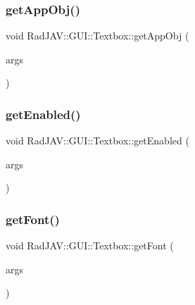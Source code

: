 \subsubsection{\texorpdfstring{get\+App\+Obj()}{getAppObj()}}
{\footnotesize\ttfamily void Rad\+J\+A\+V\+::\+G\+U\+I\+::\+Textbox\+::get\+App\+Obj (\begin{DoxyParamCaption}\item[{const v8\+::\+Function\+Callback\+Info$<$ v8\+::\+Value $>$ \&}]{args }\end{DoxyParamCaption})\hspace{0.3cm}{\ttfamily [static]}}

\mbox{\label{class_rad_j_a_v_1_1_g_u_i_1_1_textbox_a3cb05aa924bb2ac9497452eae8193d2d}} 
\subsubsection{\texorpdfstring{get\+Enabled()}{getEnabled()}}
{\footnotesize\ttfamily void Rad\+J\+A\+V\+::\+G\+U\+I\+::\+Textbox\+::get\+Enabled (\begin{DoxyParamCaption}\item[{const v8\+::\+Function\+Callback\+Info$<$ v8\+::\+Value $>$ \&}]{args }\end{DoxyParamCaption})\hspace{0.3cm}{\ttfamily [static]}}

\mbox{\label{class_rad_j_a_v_1_1_g_u_i_1_1_textbox_a4fea6c0b48e1174b2525c83630203ca8}} 
\subsubsection{\texorpdfstring{get\+Font()}{getFont()}}
{\footnotesize\ttfamily void Rad\+J\+A\+V\+::\+G\+U\+I\+::\+Textbox\+::get\+Font (\begin{DoxyParamCaption}\item[{const v8\+::\+Function\+Callback\+Info$<$ v8\+::\+Value $>$ \&}]{args }\end{DoxyParamCaption})\hspace{0.3cm}{\ttfamily [static]}}

